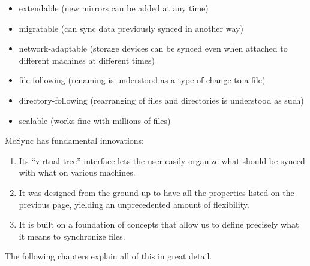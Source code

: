 \documentclass{book}
\begin{document}
\begin{itemize}
\item extendable
(new mirrors can be added at any time)

\item migratable
(can sync data previously synced in another way)

\item network-adaptable
(storage devices can be synced even when attached to different machines at different times)

\item file-following
(renaming is understood as a type of change to a file)

\item directory-following
(rearranging of files and directories is understood as such)

\item scalable
(works fine with millions of files)

\end{itemize}


\noindent McSync has  fundamental innovations:
\begin{enumerate}

\item
Its ``virtual tree'' interface lets the user easily organize
what should be synced with what on various machines.


\item
It was designed from the ground up to have
all the properties listed on the previous page,
yielding an unprecedented amount of flexibility.

\item
It is built on a foundation of concepts
that allow us to define precisely what it means to synchronize files.

\label{numInnovations}
\end{enumerate}

\noindent
The following chapters explain all of this in great detail.

%
\end{document}
